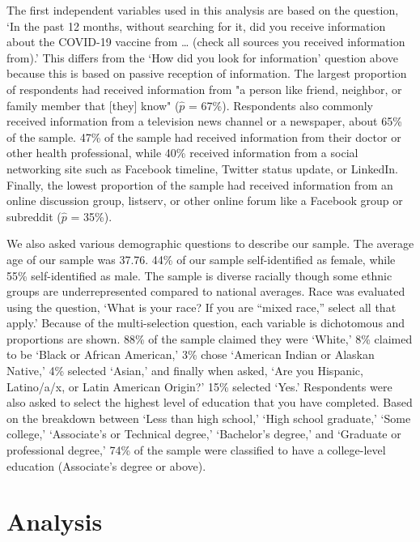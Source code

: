 The first independent variables used in this analysis are based on the question,
`In the past 12 months, without searching for it, did you receive information
about the COVID-19 vaccine from \ldots{} (check all sources you received
information from).' This differs from the `How did you look for information'
question above because this is based on passive reception of information. The
largest proportion of respondents had received information from "a person like
friend, neighbor, or family member that [they] know" (\(\widehat{p}\) = 67\%).
Respondents also commonly received information from a television news channel or
a newspaper, about 65\% of the sample. 47\% of the sample had received
information from their doctor or other health professional, while 40\% received
information from a social networking site such as Facebook timeline, Twitter
status update, or LinkedIn. Finally, the lowest proportion of the sample had
received information from an online discussion group, listserv, or other online
forum like a Facebook group or subreddit (\(\widehat{p}\) = 35\%).

We also asked various demographic questions to describe our sample. The average
age of our sample was 37.76. 44\% of our sample self-identified as female, while
55\% self-identified as male. The sample is diverse racially though some ethnic
groups are underrepresented compared to national averages. Race was evaluated
using the question, `What is your race? If you are ``mixed race,'' select all
that apply.' Because of the multi-selection question, each variable is
dichotomous and proportions are shown. 88\% of the sample claimed they were
`White,' 8\% claimed to be `Black or African American,' 3\% chose `American
Indian or Alaskan Native,' 4\% selected `Asian,' and finally when asked, `Are
you Hispanic, Latino/a/x, or Latin American Origin?' 15\% selected `Yes.'
Respondents were also asked to select the highest level of education that you
have completed. Based on the breakdown between `Less than high school,' `High
school graduate,' `Some college,' `Associate's or Technical degree,' `Bachelor's
degree,' and `Graduate or professional degree,' 74\% of the sample were
classified to have a college-level education (Associate's degree or above).

\hypertarget{analysis}{%
\section{Analysis}\label{analysis}}

